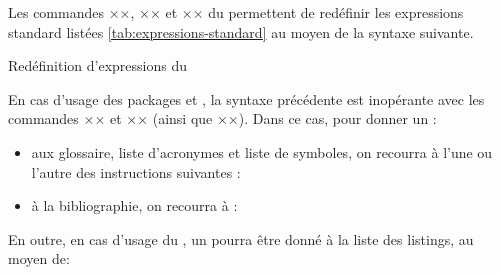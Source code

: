 Les commandes ×\addto×, ×\captionsfrench× et ×\captionsenglish× du
 permettent de redéfinir les expressions standard listées
\vref{tab:expressions-standard} au moyen de la syntaxe suivante.
\begin{preamblecode}[title=Par exemple dans le \File{\configurationfile}]
\addto{}
\addto{}
\end{preamblecode}
\begin{table}[hb]
  \centering
  
  \caption{Valeurs et commandes d'expressions standard du }
  \label{tab:expressions-standard}
\end{table}
\begin{dbexample}{Redéfinition d'expressions du }{}
\begin{preamblecode}[title=Par exemple dans le \File{\configurationfile}]
\addto{}
\addto{}
\end{preamblecode}
\end{dbexample}

En cas d'usage des packages  et , la
syntaxe précédente est inopérante avec les commandes ×\glossaryname× et
×\bibname× (ainsi que ×\refname×). Dans ce cas, pour donner un  :
\begin{itemize}
\item aux glossaire, liste d'acronymes et liste de symboles, on recourra à
  l'une ou l'autre des instructions suivantes :
\begin{bodycode}
\printglossary[title=÷\meta{titre alternatif}÷]
\printglossaries[title=÷\meta{titre alternatif}÷]
\printacronyms[title=÷\meta{titre alternatif}÷]
\printsymbols[title=÷\meta{titre alternatif}÷]
\end{bodycode}
\item à la bibliographie, on recourra à :
\begin{bodycode}
\printbibliography[title=÷\meta{titre alternatif}÷]
\end{bodycode}
\end{itemize}

En outre, en cas d'usage du , un 
pourra être donné à la liste des listings, au moyen de:
\begin{preamblecode}[title=Par exemple dans le \File{\configurationfile}]
\renewcommand\lstlistingname{÷\meta{titre alternatif}÷}
\end{preamblecode}

